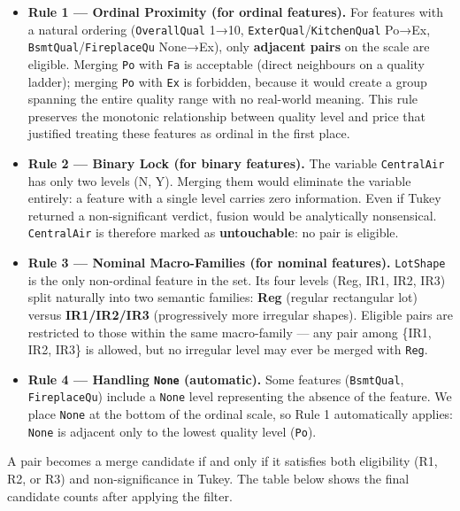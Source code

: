\begin{itemize}
\tightlist
\item
  \textbf{Rule 1 --- Ordinal Proximity (for ordinal features).} For
  features with a natural ordering (\texttt{OverallQual} 1→10,
  \texttt{ExterQual}/\texttt{KitchenQual} Po→Ex,
  \texttt{BsmtQual}/\texttt{FireplaceQu} None→Ex), only \textbf{adjacent
  pairs} on the scale are eligible. Merging \texttt{Po} with \texttt{Fa}
  is acceptable (direct neighbours on a quality ladder); merging
  \texttt{Po} with \texttt{Ex} is forbidden, because it would create a
  group spanning the entire quality range with no real-world meaning.
  This rule preserves the monotonic relationship between quality level
  and price that justified treating these features as ordinal in the
  first place.
\item
  \textbf{Rule 2 --- Binary Lock (for binary features).} The variable
  \texttt{CentralAir} has only two levels (N, Y). Merging them would
  eliminate the variable entirely: a feature with a single level carries
  zero information. Even if Tukey returned a non-significant verdict,
  fusion would be analytically nonsensical. \texttt{CentralAir} is
  therefore marked as \textbf{untouchable}: no pair is eligible.
\item
  \textbf{Rule 3 --- Nominal Macro-Families (for nominal features).}
  \texttt{LotShape} is the only non-ordinal feature in the set. Its four
  levels (Reg, IR1, IR2, IR3) split naturally into two semantic
  families: \textbf{Reg} (regular rectangular lot) versus
  \textbf{IR1/IR2/IR3} (progressively more irregular shapes). Eligible
  pairs are restricted to those within the same macro-family --- any
  pair among \{IR1, IR2, IR3\} is allowed, but no irregular level may
  ever be merged with \texttt{Reg}.
\item
  \textbf{Rule 4 --- Handling \texttt{None} (automatic).} Some features
  (\texttt{BsmtQual}, \texttt{FireplaceQu}) include a \texttt{None}
  level representing the absence of the feature. We place \texttt{None}
  at the bottom of the ordinal scale, so Rule 1 automatically applies:
  \texttt{None} is adjacent only to the lowest quality level
  (\texttt{Po}).
\end{itemize}

A pair becomes a merge candidate if and only if it satisfies both
eligibility (R1, R2, or R3) and non-significance in Tukey. The table
below shows the final candidate counts after applying the filter.

